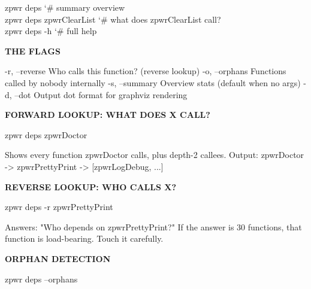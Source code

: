 \documentclass[11pt,a4paper,twoside]{book}
\begin{document}
\begin{codebox}
\color{neongreen}zpwr deps                          {\char`\#} summary overview\\
\color{neongreen}zpwr deps zpwrClearList             {\char`\#} what does zpwrClearList call?\\
\color{neongreen}zpwr deps -h                        {\char`\#} full help\\
\end{codebox}


\vspace{12pt}
{\bfseries\color{neonyellow} THE FLAGS}\vspace{4pt}

-r, --reverse    Who calls this function? (reverse lookup) -o, --orphans    Functions called by nobody internally -s, --summary    Overview stats (default when no args) -d, --dot        Output dot format for graphviz rendering


\vspace{12pt}
{\bfseries\color{neonyellow} FORWARD LOOKUP: WHAT DOES X CALL?}\vspace{4pt}

\begin{codebox}
\color{neongreen}zpwr deps zpwrDoctor\\
\end{codebox}

Shows every function zpwrDoctor calls, plus depth-2 callees. Output:  zpwrDoctor -> zpwrPrettyPrint -> [zpwrLogDebug, ...]


\vspace{12pt}
{\bfseries\color{neonyellow} REVERSE LOOKUP: WHO CALLS X?}\vspace{4pt}

\begin{codebox}
\color{neongreen}zpwr deps -r zpwrPrettyPrint\\
\end{codebox}

Answers: "Who depends on zpwrPrettyPrint?" If the answer is 30 functions, that function is load-bearing. Touch it carefully.


\vspace{12pt}
{\bfseries\color{neonyellow} ORPHAN DETECTION}\vspace{4pt}

\begin{codebox}
\color{neongreen}zpwr deps --orphans\\
\end{codebox}
\end{document}
